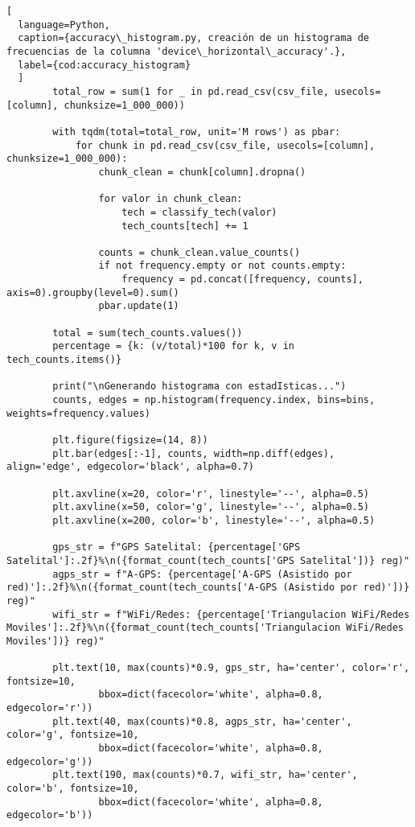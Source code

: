 \begin{lstlisting}[
  language=Python,
  caption={accuracy\_histogram.py, creación de un histograma de frecuencias de la columna 'device\_horizontal\_accuracy'.},
  label={cod:accuracy_histogram}
  ]
        total_row = sum(1 for _ in pd.read_csv(csv_file, usecols=[column], chunksize=1_000_000))
        
        with tqdm(total=total_row, unit='M rows') as pbar:
            for chunk in pd.read_csv(csv_file, usecols=[column], chunksize=1_000_000):
                chunk_clean = chunk[column].dropna()
                
                for valor in chunk_clean:
                    tech = classify_tech(valor)
                    tech_counts[tech] += 1
                
                counts = chunk_clean.value_counts()
                if not frequency.empty or not counts.empty:
                    frequency = pd.concat([frequency, counts], axis=0).groupby(level=0).sum()
                pbar.update(1)

        total = sum(tech_counts.values())
        percentage = {k: (v/total)*100 for k, v in tech_counts.items()}

        print("\nGenerando histograma con estadIsticas...")
        counts, edges = np.histogram(frequency.index, bins=bins, weights=frequency.values)

        plt.figure(figsize=(14, 8))
        plt.bar(edges[:-1], counts, width=np.diff(edges), align='edge', edgecolor='black', alpha=0.7)
        
        plt.axvline(x=20, color='r', linestyle='--', alpha=0.5)
        plt.axvline(x=50, color='g', linestyle='--', alpha=0.5)
        plt.axvline(x=200, color='b', linestyle='--', alpha=0.5)
        
        gps_str = f"GPS Satelital: {percentage['GPS Satelital']:.2f}%\n({format_count(tech_counts['GPS Satelital'])} reg)"
        agps_str = f"A-GPS: {percentage['A-GPS (Asistido por red)']:.2f}%\n({format_count(tech_counts['A-GPS (Asistido por red)'])} reg)"
        wifi_str = f"WiFi/Redes: {percentage['Triangulacion WiFi/Redes Moviles']:.2f}%\n({format_count(tech_counts['Triangulacion WiFi/Redes Moviles'])} reg)"
        
        plt.text(10, max(counts)*0.9, gps_str, ha='center', color='r', fontsize=10, 
                bbox=dict(facecolor='white', alpha=0.8, edgecolor='r'))
        plt.text(40, max(counts)*0.8, agps_str, ha='center', color='g', fontsize=10, 
                bbox=dict(facecolor='white', alpha=0.8, edgecolor='g'))
        plt.text(190, max(counts)*0.7, wifi_str, ha='center', color='b', fontsize=10, 
                bbox=dict(facecolor='white', alpha=0.8, edgecolor='b'))


\end{lstlisting}

